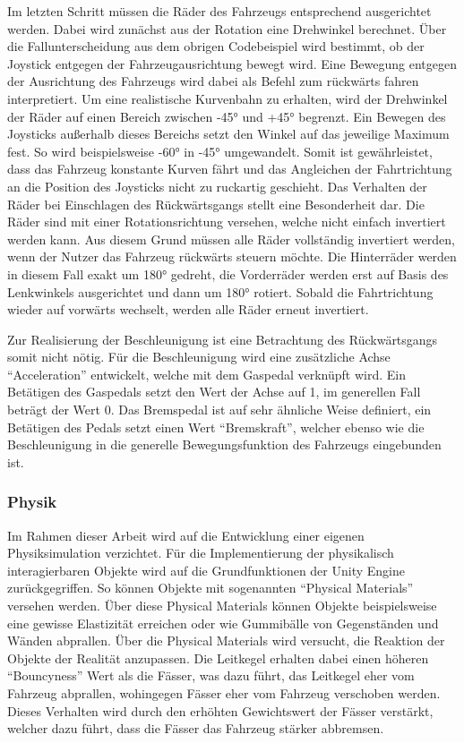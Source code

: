 	Im letzten Schritt müssen die Räder des Fahrzeugs entsprechend ausgerichtet werden. Dabei wird zunächst aus der Rotation eine Drehwinkel berechnet. Über die Fallunterscheidung aus dem obrigen Codebeispiel wird bestimmt, ob der Joystick entgegen der Fahrzeugausrichtung bewegt wird. Eine Bewegung entgegen der Ausrichtung des Fahrzeugs wird dabei als Befehl zum rückwärts fahren interpretiert. Um eine realistische Kurvenbahn zu erhalten, wird der Drehwinkel der Räder auf einen Bereich zwischen -45° und +45° begrenzt. Ein Bewegen des Joysticks außerhalb dieses Bereichs setzt den Winkel auf das jeweilige Maximum fest. So wird beispielsweise -60° in -45° umgewandelt. Somit ist gewährleistet, dass das Fahrzeug konstante Kurven fährt und das Angleichen der Fahrtrichtung an die Position des Joysticks nicht zu ruckartig geschieht. Das Verhalten der Räder bei Einschlagen des Rückwärtsgangs stellt eine Besonderheit dar. Die Räder sind mit einer Rotationsrichtung versehen, welche nicht einfach invertiert werden kann. Aus diesem Grund müssen alle Räder vollständig invertiert werden, wenn der Nutzer das Fahrzeug rückwärts steuern möchte. Die Hinterräder werden in diesem Fall exakt um 180° gedreht, die Vorderräder werden erst auf Basis des Lenkwinkels ausgerichtet und dann um 180° rotiert. Sobald die Fahrtrichtung wieder auf vorwärts wechselt, werden alle Räder erneut invertiert. 

	Zur Realisierung der Beschleunigung ist eine Betrachtung des Rückwärtsgangs somit nicht nötig. Für die Beschleunigung wird eine zusätzliche Achse \enquote{Acceleration} entwickelt, welche mit dem Gaspedal verknüpft wird. Ein Betätigen des Gaspedals setzt den Wert der Achse auf 1, im generellen Fall beträgt der Wert 0. Das Bremspedal ist auf sehr ähnliche Weise definiert, ein Betätigen des Pedals setzt einen Wert \enquote{Bremskraft}, welcher ebenso wie die Beschleunigung in die generelle Bewegungsfunktion des Fahrzeugs eingebunden ist.


	\subsubsection{Physik}
	Im Rahmen dieser Arbeit wird auf die Entwicklung einer eigenen Physiksimulation verzichtet. Für die Implementierung der physikalisch interagierbaren Objekte wird auf die Grundfunktionen der Unity Engine zurückgegriffen. So können Objekte mit sogenannten \enquote{Physical Materials} versehen werden. Über diese Physical Materials können Objekte beispielsweise eine gewisse Elastizität erreichen oder wie Gummibälle von Gegenständen und Wänden abprallen. Über die Physical Materials wird versucht, die Reaktion der Objekte der Realität anzupassen. Die Leitkegel erhalten dabei einen höheren \enquote{Bouncyness} Wert als die Fässer, was dazu führt, das Leitkegel eher vom Fahrzeug abprallen, wohingegen Fässer eher vom Fahrzeug verschoben werden. Dieses Verhalten wird durch den erhöhten Gewichtswert der Fässer verstärkt, welcher dazu führt, dass die Fässer das Fahrzeug stärker abbremsen.

